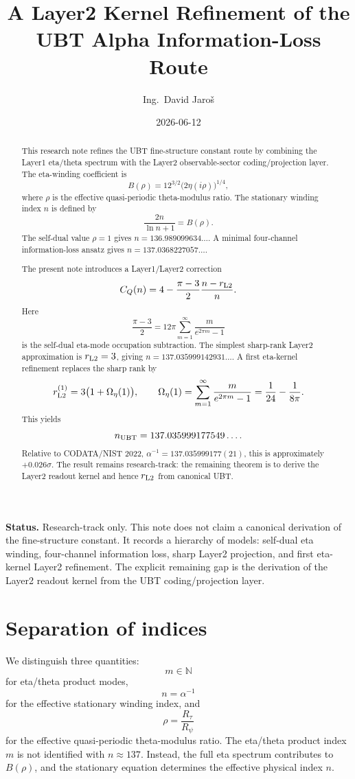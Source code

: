 \documentclass[12pt,a4paper]{article}
\title{A Layer2 Kernel Refinement of the UBT Alpha Information-Loss Route}
\author{Ing.\ David Jaro\v{s}}
\date{2026-06-12}
\begin{document}
\maketitle

\begin{abstract}
This research note refines the UBT fine-structure constant route by combining
the Layer1 eta/theta spectrum with the Layer2 observable-sector
coding/projection layer.  The eta-winding coefficient is
\[
  B(\rho)=12^{3/2}\bigl(2\eta(i\rho)\bigr)^{1/4},
\]
where $\rho$ is the effective quasi-periodic theta-modulus ratio.  The
stationary winding index $n$ is defined by
\[
  \frac{2n}{\ln n+1}=B(\rho).
\]
The self-dual value $\rho=1$ gives $n=136.989099634\ldots$.  A minimal
four-channel information-loss ansatz gives $n=137.0368227057\ldots$.

The present note introduces a Layer1/Layer2 correction
\[
  C_Q(n)
  =
  4-\frac{\pi-3}{2}\frac{n-r_{\rm L2}}{n}.
\]
Here
\[
  \frac{\pi-3}{2}
  =
  12\pi
  \sum_{m=1}^{\infty}\frac{m}{e^{2\pi m}-1}
\]
is the self-dual eta-mode occupation subtraction.  The simplest sharp-rank
Layer2 approximation is $r_{\rm L2}=3$, giving
$n=137.035999142931\ldots$.  A first eta-kernel refinement replaces the sharp
rank by
\[
  r_{\rm L2}^{(1)}=3\bigl(1+\Omega_\eta(1)\bigr),
  \qquad
  \Omega_\eta(1)=
  \sum_{m=1}^{\infty}\frac{m}{e^{2\pi m}-1}
  =
  \frac{1}{24}-\frac{1}{8\pi}.
\]
This yields
\[
  n_{\rm UBT}=137.035999177549\ldots .
\]
Relative to CODATA/NIST 2022,
$\alpha^{-1}=137.035999177(21)$, this is approximately $+0.026\sigma$.
The result remains research-track: the remaining theorem is to derive the
Layer2 readout kernel and hence $r_{\rm L2}$ from canonical UBT.
\end{abstract}

\begin{statusbox}
\textbf{Status.} Research-track only.  This note does not claim a canonical
derivation of the fine-structure constant.  It records a hierarchy of models:
self-dual eta winding, four-channel information loss, sharp Layer2 projection,
and first eta-kernel Layer2 refinement.  The explicit remaining gap is the
derivation of the Layer2 readout kernel from the UBT coding/projection layer.
\end{statusbox}

\section{Separation of indices}

We distinguish three quantities:
\[
  m \in \mathbb{N}
\]
for eta/theta product modes,
\[
  n=\alpha^{-1}
\]
for the effective stationary winding index, and
\[
  \rho=\frac{R_\tau}{R_\psi}
\]
for the effective quasi-periodic theta-modulus ratio.  The eta/theta product
index $m$ is not identified with $n\approx137$.  Instead, the full eta
spectrum contributes to $B(\rho)$, and the stationary equation determines the
effective physical index $n$.
\end{document}
